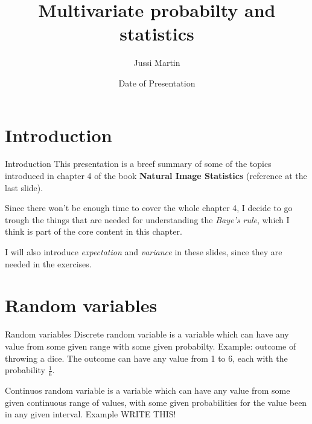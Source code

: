 \documentclass{beamer}
\title[Multivariate probabilty and statistics]{Multivariate probabilty and statistics}
\author{Jussi Martin}
\date{Date of Presentation}
\begin{document}
\begin{frame}
  \titlepage
\end{frame}


%
%
%
%
%

\section{Introduction}

\begin{frame}{Introduction}
  This presentation is a breef summary of some of the topics introduced in
  chapter 4 of the book \textbf{Natural Image Statistics} (reference at
  the last slide).

  Since there won't be enough time to cover the whole chapter 4, I decide to go
  trough the things that are needed for understanding the \emph{Baye's rule},
  which I think is part of the core content in this chapter.

  I will also introduce \emph{expectation} and \emph{variance} in these slides,
  since they are needed in the exercises.
\end{frame}

\section{Random variables}

\begin{frame}{Random variables}
 Discrete random variable is a variable which can have any value from some given
 range with some given probabilty. Example: outcome of throwing a dice. The outcome
 can have any value from 1 to 6, each with the probability $\frac{1}{6}$.

 Continuos random variable is a variable which can have any value from some given
 continuous range of values, with some given probabilities for the value been in
 any given interval. Example WRITE THIS!
\end{frame}
\end{document}
